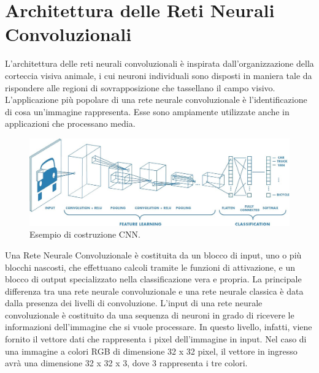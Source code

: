 {\section{Architettura delle Reti Neurali Convoluzionali}	
L'architettura delle reti neurali convoluzionali è inspirata dall'organizzazione della corteccia visiva animale,  i cui neuroni individuali sono disposti in maniera tale da rispondere alle regioni di sovrapposizione che tassellano il campo visivo. L'applicazione più popolare di una rete neurale convoluzionale è l'identificazione di cosa un'immagine rappresenta. 
\newline
Esse sono ampiamente utilizzate anche in applicazioni che processano media. 
\newline
	\begin{figure}[h]
	\begin{center}
		\includegraphics[scale=0.33]{figure/capitolo3/rnc.jpeg}
	\end{center}
	\caption{Esempio di costruzione CNN.}	
\end{figure}
\newline
Una Rete Neurale Convoluzionale è costituita da un blocco di input, uno o più blocchi nascosti, che effettuano calcoli tramite le funzioni di attivazione, e un blocco di output specializzato nella classificazione vera e propria. \cite{maiani2016applicazioni}
\newline
La principale differenza tra una rete neurale convoluzionale e una rete neurale classica è data dalla presenza dei livelli di convoluzione.
\newline 
L'input di una rete neurale convoluzionale è costituito da una sequenza di neuroni in grado di ricevere le informazioni dell'immagine che si vuole processare.
\newline
In questo livello, infatti, viene fornito il vettore dati che rappresenta i pixel dell'immagine in input. Nel caso di una immagine a colori RGB di dimensione 32 x 32 pixel, il vettore in ingresso avrà una dimensione 32 x 32 x 3, dove 3 rappresenta i tre colori.
\newline
}
